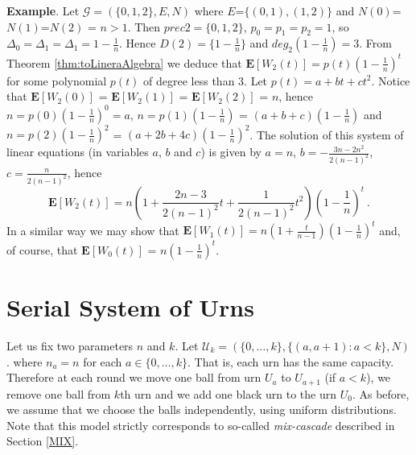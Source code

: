\documentclass[submission]{dmtcs}
\newcommand{\E}[1]{\mathbf{E}\left[#1\right]}
\begin{document}
\par
\textbf{Example}. Let $\mathcal{G}= (\{0,1,2\},E,N)$ where $E$=$\{(0,1),(1,2)\}$
and $N(0)$=$N(1)$=$N(2)$ = $n>1$. Then $prec{2} = \{0,1,2\}$, $p_0 = p_1 = p_2 = 1$, so
$\Delta_0 = \Delta_1 = \Delta_1 =1 - \frac1n$. Hence $D(2) = \{1-\frac1n\}$ and
$deg_2(1-\frac1n)=3$. 
From Theorem \ref{thm:toLineraAlgebra} we deduce that 
$\E{W_2(t)} = p(t) (1-\frac1n)^t$ for some polynomial $p(t)$ of degree less than $3$.
Let $p(t) = a + b t + ct^2$. Notice that $\E{W_2(0)}$ = $\E{W_2(1)}$ = $\E{W_2(2)}$ = $n$,
hence $ n = p(0)(1-\frac1n)^0 = a$, 
$n = p(1)(1-\frac1n)$ = $(a+b+c)(1-\frac1n)$ and
$n = p(2)(1-\frac1n)^2$ = $(a+2b+4c)(1-\frac1n)^2$.    
The solution of this system of linear equations (in variables $a$, $b$ and $c$) is given by 
$a =  n$, $b= -\frac{3 n-2 n^2}{2 (n-1)^2}$, $c= \frac{n}{2 (n-1)^2}$, hence
$$
  \E{W_2(t)} = n\left(1 + \frac{2n-3}{2(n-1)^2}t + \frac{1}{2 (n-1)^2} t^2\right)\left(1-\frac1n\right)^t~.
$$
In a similar way we may show that 
$\E{W_1(t)} = n \left(1 + \frac{t}{n-1}\right) \left(1-\frac{1}{n}\right)^t$
and, of course, that $\E{W_0(t)}$  = $n (1-\frac1n)^t$. 



\section{Serial System of Urns}\label{Serial}

Let us fix two parameters $n$ and $k$.
Let $\mathcal{U}_k = (\{0,\ldots,k\},\{(a,a+1):a<k\},N)$.
where $n_a = n$ for each $a \in \{0,\ldots,k\}$. That is, each urn has the same capacity.
Therefore at each round we move one ball from urn $U_a$ to $U_{a+1}$ (if $a<k$), we remove
one ball from $k$th urn and we add one black urn to the urn $U_0$.
As before, we assume that we choose the balls independently, using uniform distributions.
Note that this model strictly corresponds to so-called \textit{mix-cascade} described in Section \ref{MIX}. 
\end{document}
